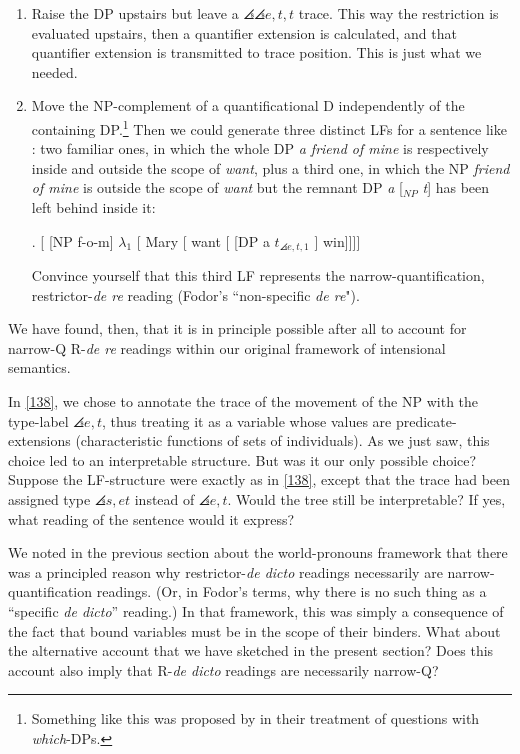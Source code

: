 \begin{enumerate}[{Way} 1]
  
  \item Raise the DP upstairs but leave a $\angles{\angles{e,t},t}$ trace. This way the restriction is evaluated upstairs, then a quantifier extension is calculated, and that quantifier extension is transmitted to trace position. This is just what we needed.
  
  \item Move the NP-complement of a quantificational D independently of the containing DP.\footnote{Something like this was proposed by \citet{groenendijk-stokhof:L&P:82} in their treatment of questions with \emph{which}-DPs.} Then we could generate three distinct LFs for a sentence like : two familiar ones, in which the whole DP \emph{a friend of mine} is respectively inside and outside the scope of \emph{want}, plus a third one, in which the NP \emph{friend of mine} is outside the scope of \emph{want} but the remnant DP \emph{a} [$_{NP}$ \emph{t}] has been left behind inside it:
  
  \exi. \label{138} [ [NP f-o-m] $\lambda_1$ [ Mary [ want [ [DP a $t_{\angles{e,t},1}$ ] win]]]]
  
  \begin{exercise}
      Convince yourself that this third LF represents the narrow-quantification, restrictor-\emph{de re} reading (Fodor's ``non-specific \emph{de re}"). \eex 
  \end{exercise}
\end{enumerate}
%
We have found, then, that it is in principle possible after all to account for narrow-Q R-\emph{de re} readings within our original framework of intensional semantics.

\begin{exercise}
  In \ref{138}, we chose to annotate the trace of the movement of the NP with the type-label $\angles{e,t}$, thus treating it as a variable whose values are predicate-extensions (characteristic functions of sets of individuals). As we just saw, this choice led to an interpretable structure. But was it our only possible choice? Suppose the LF-structure were exactly as in \ref{138}, except that the trace had been assigned type $\angles{s,et}$ instead of $\angles{e,t}$. Would the tree still be interpretable? If yes, what reading of the sentence would it express? \eex 
\end{exercise}

\begin{exercise}
  We noted in the previous section about the world-pronouns framework that there was a principled reason why restrictor-\emph{de dicto} readings necessarily are narrow-quantification readings. (Or, in Fodor's terms, why there is no such thing as a ``specific \emph{de dicto}'' reading.) In that framework, this was simply a consequence of the fact that bound variables must be in the scope of their binders. What about the alternative account that we have sketched in the present section? Does this account also imply that R-\emph{de dicto} readings are necessarily narrow-Q? \eex 
\end{exercise}

